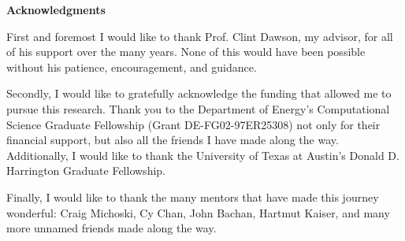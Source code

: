 \newpage
\thispagestyle{plain} 
\vspace*{1cm}
\begin{center}
\textbf{Acknowledgments}
\end{center}
\vspace{1cm}

First and foremost I would like to thank Prof. Clint Dawson, my advisor, for all of his support over the many years. None of this would have been possible without his patience, encouragement, and guidance.


Secondly, I would like to gratefully acknowledge the funding that allowed me to pursue this research. Thank you to the Department of Energy's Computational Science Graduate Fellowship (Grant DE-FG02-97ER25308) not only for their financial support, but also all the friends I have made along the way. Additionally, I would like to thank the University of Texas at Austin's Donald D. Harrington Graduate Fellowship.


Finally, I would like to thank the many mentors that have made this journey wonderful: Craig Michoski, Cy Chan, John Bachan, Hartmut Kaiser, and many more unnamed friends made along the way.
